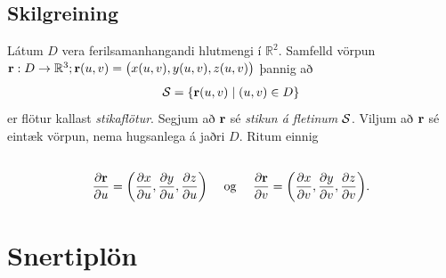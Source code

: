 \documentclass[a4paper,10pt,icelandic]{sphinxmanual}
\begin{document}
\subsection{Skilgreining}
\label{Kafli5:id16}
Látum \(D\) vera ferilsamanhangandi hlutmengi í
\({\mathbb  R}^2\). Samfelld vörpun
\(\mbox{${\bf r}$}:D\rightarrow {\mathbb  R}^3; \mbox{${\bf r}$}(u,v)=\big(x(u,v), y(u,v), z(u,v)\big)\)
þannig að
\begin{gather}
\begin{split}\displaystyle {\cal S}=\{\mbox{${\bf r}$}(u,v)\mid (u,v)\in D\}\end{split}\notag
\end{gather}
er flötur kallast \emph{stikaflötur}. Segjum að \(\mbox{${\bf r}$}\) sé
\emph{stikun á fletinum} \(\cal S\). Viljum að \(\mbox{${\bf r}$}\)
sé eintæk vörpun, nema hugsanlega á jaðri \(D\). Ritum einnig
\begin{gather}
\begin{split}\displaystyle\end{split}\notag\\\begin{split}\frac{\partial \mbox{${\bf r}$}}{\partial u}=
\bigg(\frac{\partial x}{\partial u}, \frac{\partial y}{\partial u},
\frac{\partial z}{\partial u}\bigg)\quad\mbox{ og }\quad
\frac{\partial \mbox{${\bf r}$}}{\partial v}=
\bigg(\frac{\partial x}{\partial v}, \frac{\partial y}{\partial v},
\frac{\partial z}{\partial v}\bigg).\end{split}\notag
\end{gather}

\section{Snertiplön}
\label{Kafli5:snertiplon}
\end{document}
